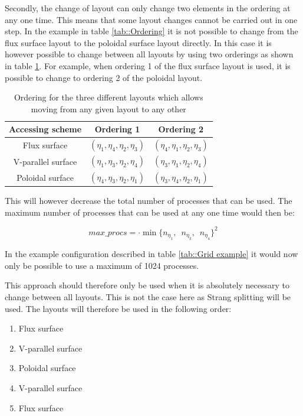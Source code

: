 Secondly, the change of layout can only change two elements in the ordering at any one time. This means that some layout changes cannot be carried out in one step. In the example in table \ref{tab::Ordering} it is not possible to change from the flux surface layout to the poloidal surface layout directly. In this case it is however possible to change between all layouts by using two orderings as shown in table \ref{tab::Flexi Ordering}. For example, when ordering 1 of the flux surface layout is used, it is possible to change to ordering 2 of the poloidal layout.

\begin{table}[ht]
\begin{center}
 \begin{tabular}{|c|c|c|}
  \hline
  Accessing scheme & Ordering 1 & Ordering 2\\
  \hline
  Flux surface & $(\eta_1,\eta_4,\eta_2,\eta_3)$ & $(\eta_4,\eta_1,\eta_2,\eta_3)$\\
  \hline
  V-parallel surface  & $(\eta_1,\eta_3,\eta_2,\eta_4)$ & $(\eta_3,\eta_1,\eta_2,\eta_4)$\\
  \hline
  Poloidal surface & $(\eta_4,\eta_3,\eta_2,\eta_1)$ & $(\eta_3,\eta_4,\eta_2,\eta_1)$\\
  \hline
 \end{tabular}
 \caption{\label{tab::Flexi Ordering} Ordering for the three different layouts which allows moving from any given layout to any other}
\end{center}
\end{table}

This will however decrease the total number of processes that can be used. The maximum number of processes that can be used at any one time would then be:

$$max\_procs = \cdot \min\{n_{\eta_1},\, \, \, n_{\eta_3},\, \, \, n_{\eta_4}\}^2$$

In the example configuration described in table \ref{tab::Grid example} it would now only be possible to use a maximum of 1024 processes.

This approach should therefore only be used when it is absolutely necessary to change between all layouts. This is not the case here as Strang splitting will be used. The layouts will therefore be used in the following order:

\begin{enumerate}
 \item Flux surface
 \item V-parallel surface
 \item Poloidal surface
 \item V-parallel surface
 \item Flux surface
\end{enumerate}

